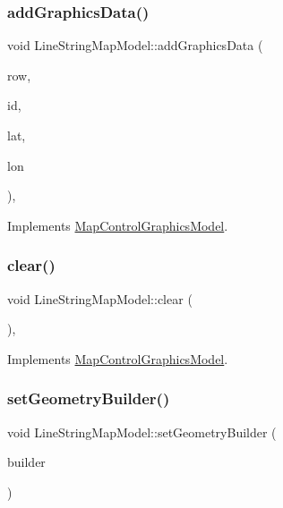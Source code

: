 \subsubsection{\texorpdfstring{addGraphicsData()}{addGraphicsData()}}
{\footnotesize\ttfamily void Line\+String\+Map\+Model\+::add\+Graphics\+Data (\begin{DoxyParamCaption}\item[{int}]{row,  }\item[{int}]{id,  }\item[{float}]{lat,  }\item[{float}]{lon }\end{DoxyParamCaption})\hspace{0.3cm}{\ttfamily [override]}, {\ttfamily [virtual]}}



Implements \mbox{\hyperlink{class_map_control_graphics_model_ac80001f23a6059b9f8d600200920a5ea}{Map\+Control\+Graphics\+Model}}.

\mbox{\label{class_line_string_map_model_a55ac4e44332434feaa70f15edfd1f925}} 
\subsubsection{\texorpdfstring{clear()}{clear()}}
{\footnotesize\ttfamily void Line\+String\+Map\+Model\+::clear (\begin{DoxyParamCaption}{ }\end{DoxyParamCaption})\hspace{0.3cm}{\ttfamily [override]}, {\ttfamily [virtual]}}



Implements \mbox{\hyperlink{class_map_control_graphics_model_a2cfbe94a0c1124d5af186a75245de1e2}{Map\+Control\+Graphics\+Model}}.

\mbox{\label{class_line_string_map_model_a91414d80085600c4e89dbac25cb30d8e}} 
\subsubsection{\texorpdfstring{setGeometryBuilder()}{setGeometryBuilder()}}
{\footnotesize\ttfamily void Line\+String\+Map\+Model\+::set\+Geometry\+Builder (\begin{DoxyParamCaption}\item[{\mbox{\hyperlink{class_line_string_map_model_aca5f8e0c93dad8e39f8ec3aed0eee6a0}{Line\+String\+Map\+Model\+::\+Geometry\+Builder}}}]{builder }\end{DoxyParamCaption})}


